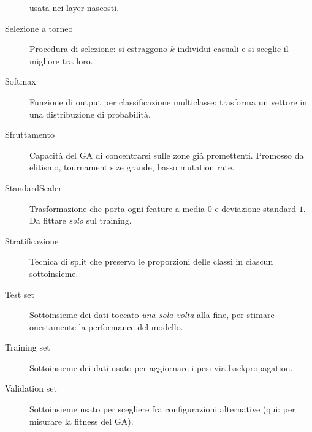 \documentclass[11pt,a4paper]{article}
\begin{document}
\begin{description}
        usata nei layer nascosti.
    \item[Selezione a torneo] Procedura di selezione: si estraggono $k$
        individui casuali e si sceglie il migliore tra loro.
    \item[Softmax] Funzione di output per classificazione multiclasse:
        trasforma un vettore in una distribuzione di probabilità.
    \item[Sfruttamento] Capacità del GA di concentrarsi sulle zone già
        promettenti. Promosso da elitismo, tournament size grande, basso
        mutation rate.
    \item[StandardScaler] Trasformazione che porta ogni feature a media
        $0$ e deviazione standard $1$. Da fittare \emph{solo} sul
        training.
    \item[Stratificazione] Tecnica di split che preserva le proporzioni
        delle classi in ciascun sottoinsieme.
    \item[Test set] Sottoinsieme dei dati toccato \emph{una sola volta}
        alla fine, per stimare onestamente la performance del modello.
    \item[Training set] Sottoinsieme dei dati usato per aggiornare i
        pesi via backpropagation.
    \item[Validation set] Sottoinsieme usato per scegliere fra
        configurazioni alternative (qui: per misurare la fitness del GA).
\end{description}
\end{document}
